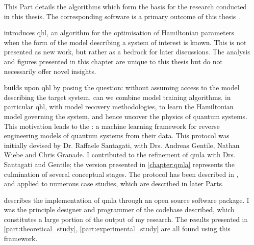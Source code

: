 This Part details the algorithms which form the basis for the research conducted in this thesis. 
The corresponding software is a primary outcome of this thesis \cite{flynn2021QMLA, qmla_docs}.

\par 
\vspace{1cm}

 introduces \gls{qhl}, an algorithm for the optimisation of Hamiltonian parameters
    when the form of the model describing a system of interest is known. 
    This is not presented as new work, but rather as a bedrock for later discussions. 
    The analysis and figures presented in this chapter are unique to this thesis but do not necessarily offer novel insights. 
\par 
\vspace{1cm}
 builds upon \gls{qhl} by posing the question: 
    without assuming access to the model describing the target system, can we combine model training algorithms, 
    in particular \gls{qhl}, with model recovery methodologies, to learn the Hamiltonian model 
    governing the system, and hence uncover the physics of quantum systems. 
    This motivation leads to the : 
    a machine learning framework for reverse engineering models of quantum systems from their data.
    This protocol was initially devised by Dr. Raffaele Santagati, with Drs. Andreas Gentile, Nathan Wiebe and Chris Granade. 
    I contributed to the refinement of \gls{qmla} with Drs. Santagati and Gentile; 
    the version presented in \cref{chapter:qmla} represents the culmination of several conceptual stages. 
    The protocol has been described in \cite{gentile2020learning}, 
    and applied to numerous case studies, which are described in later Parts. 
\par
\vspace{1cm}

 describes the implementation of \gls{qmla} through an open source software package. 
I was the principle designer and programmer of the codebase described, which constitutes a large portion of the output of my research. 
The results presented in \cref{part:theoretical_study}, \cref{part:experimental_study} are all found using this framework. 
